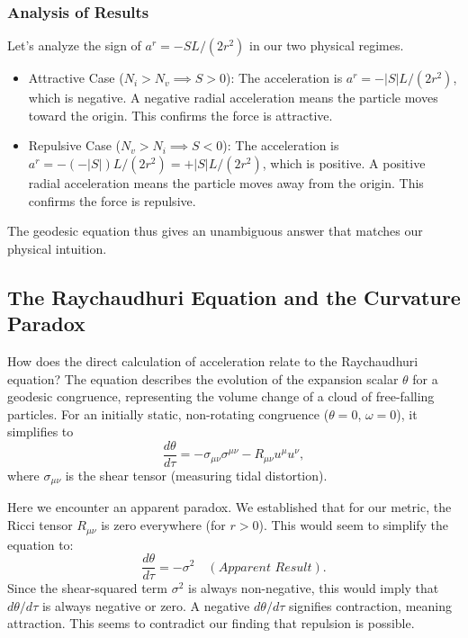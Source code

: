 \documentclass[%
  reprint,
  superscriptaddress,
  showpacs,
  showkeys,
  amsmath,amssymb,
  pra,
  longbibliography,
  floatfix,
]{revtex4-2}
\begin{document}
\subsubsection{Analysis of Results}
Let's analyze the sign of $a^r = -SL/(2r^2)$ in our two physical regimes.
\begin{itemize}
    \item {Attractive Case ($N_i > N_v \implies S > 0$):}
    The acceleration is $a^r = -|S|L/(2r^2)$, which is {negative}. A negative radial acceleration means the particle moves toward the origin. This confirms the force is attractive.

    \item {Repulsive Case ($N_v > N_i \implies S < 0$):}
    The acceleration is $a^r = -(-|S|)L/(2r^2) = +|S|L/(2r^2)$, which is {positive}. A positive radial acceleration means the particle moves away from the origin. This confirms the force is repulsive.
\end{itemize}
The geodesic equation thus gives an unambiguous answer that matches our physical intuition.

\subsection{The Raychaudhuri Equation and the Curvature Paradox}

How does the direct calculation of acceleration relate to the Raychaudhuri equation? The equation describes the evolution of the expansion scalar $\theta$ for a geodesic congruence, representing the volume change of a cloud of free-falling particles. For an initially static, non-rotating congruence ($\theta=0$, $\omega=0$), it simplifies to
\begin{equation}
\frac{d\theta}{d\tau} = - \sigma_{\mu\nu}\sigma^{\mu\nu} - R_{\mu\nu}u^\mu u^\nu,
\label{eq:raychaudhuri}
\end{equation}
where $\sigma_{\mu\nu}$ is the shear tensor (measuring tidal distortion).

Here we encounter an apparent paradox. We established that for our metric, the Ricci tensor $R_{\mu\nu}$ is zero everywhere (for $r>0$). This would seem to simplify the equation to:
\begin{equation}
\frac{d\theta}{d\tau} = - \sigma^2 \quad (\textit{Apparent Result}).
\end{equation}
Since the shear-squared term $\sigma^2$ is always non-negative, this would imply that $d\theta/d\tau$ is always negative or zero. A negative $d\theta/d\tau$ signifies contraction, meaning attraction. This seems to contradict our finding that repulsion is possible.
\end{document}
